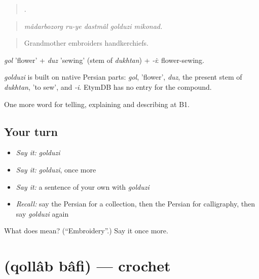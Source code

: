 \begin{quote}
    .
\end{quote}

\begin{quote}
\emph{mâdarbozorg ru-ye dastmâl golduzi mikonad.}
\end{quote}

\begin{quote}
Grandmother embroiders handkerchiefs.
\end{quote}

\emph{gol} 'flower' + \emph{duz} 'sewing' (stem of \emph{dukhtan}) + \emph{-i}: flower-sewing.

\begin{cousinweb}
\emph{golduzi} is built on native Persian parts: \emph{gol}, 'flower', \emph{duz}, the present stem of \emph{dukhtan}, 'to sew', and \emph{-i}. EtymDB has no entry for the compound.
\end{cousinweb}

\begin{grammarlens}[title={What you've built}]
One more word for telling, explaining and describing at B1.
\end{grammarlens}

\subsection*{Your turn}
\begin{itemize}
\raggedright
  \item \emph{Say it:} \emph{golduzi}
  \item \emph{Say it:} \emph{golduzi}, once more
  \item \emph{Say it:} a sentence of your own with \emph{golduzi}
  \item \emph{Recall:} say the Persian for a collection, then the Persian for calligraphy, then say \emph{golduzi} again
\end{itemize}

\begin{tcolorbox}[breakable,colback=teal!4,colframe=teal!35!black,title={Before you move on}]
What does  mean? (\textquotedblleft{}Embroidery\textquotedblright{}.) Say it once more.
\end{tcolorbox}
\section[\texorpdfstring{\fa{قلاب} \fa{بافی} (qollâb bâfi)}{قلاب بافی (qollâb bâfi)}]{  (qollâb bâfi) — crochet}

